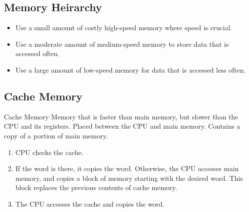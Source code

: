 \documentclass[\main/notes.tex]{subfiles}
\begin{document}
			\subsection{Memory Heirarchy}
				\begin{center}
				\end{center}
				\begin{itemize}
					\item Use a small amount of costly high-speed memory where speed is crucial.
					\item Use a moderate amount of medium-speed memory to store data that is accessed often.
					\item Use a large amount of low-speed memory for data that is accessed less often.
				\end{itemize}
			\subsection{Cache Memory}
				\begin{definition}{Cache Memory}
					Memory that is faster than main memory, but slower than the CPU and its registers. Placed between the CPU and main memory. Contains a copy of a portion of main memory.
				\end{definition}
				\begin{enumerate}
					\item CPU checks the cache.
					\item If the word is there, it copies the word. Otherwise, the CPU accesses main memory, and copies a block of memory starting with the desired word. This block replaces the previous contents of cache memory.
					\item The CPU accesses the cache and copies the word.
				\end{enumerate}
		\pagebreak
\end{document}
